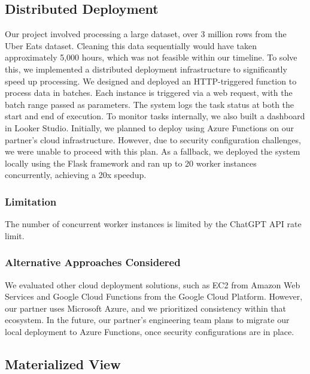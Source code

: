 \documentclass[
  11pt,
  a4paper,
  DIV=11,
  numbers=noendperiod]{scrartcl}
\begin{document}
\subsection{Distributed Deployment}\label{distributed-deployment}

Our project involved processing a large dataset, over 3 million rows
from the Uber Eats dataset. Cleaning this data sequentially would have
taken approximately 5,000 hours, which was not feasible within our
timeline. To solve this, we implemented a distributed deployment
infrastructure to significantly speed up processing. We designed and
deployed an HTTP-triggered function to process data in batches. Each
instance is triggered via a web request, with the batch range passed as
parameters. The system logs the task status at both the start and end of
execution. To monitor tasks internally, we also built a dashboard in
Looker Studio. Initially, we planned to deploy using Azure Functions on
our partner's cloud infrastructure. However, due to security
configuration challenges, we were unable to proceed with this plan. As a
fallback, we deployed the system locally using the Flask framework and
ran up to 20 worker instances concurrently, achieving a 20x speedup.

\subsubsection{Limitation}\label{limitation-1}

The number of concurrent worker instances is limited by the ChatGPT API
rate limit.

\subsubsection{Alternative Approaches
Considered}\label{alternative-approaches-considered}

We evaluated other cloud deployment solutions, such as EC2 from Amazon
Web Services and Google Cloud Functions from the Google Cloud Platform.
However, our partner uses Microsoft Azure, and we prioritized
consistency within that ecosystem. In the future, our partner's
engineering team plans to migrate our local deployment to Azure
Functions, once security configurations are in place.

\subsection{Materialized View}\label{materialized-view}
\end{document}
